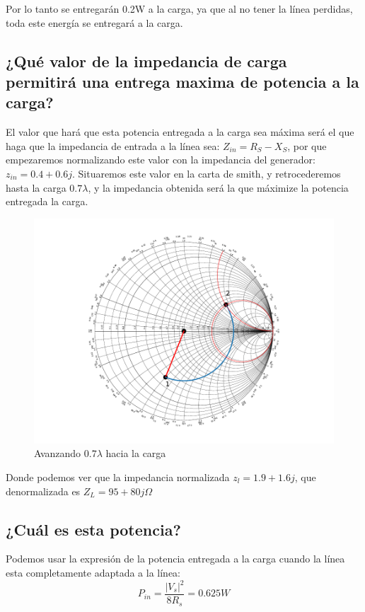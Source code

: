 Por lo tanto se entregarán 0.2W a la carga, ya que al no tener la línea perdidas, toda este energía se entregará a la carga.

\subsection{¿Qué valor de la impedancia de carga permitirá una entrega maxima de potencia a la carga?}
El valor que hará que esta potencia entregada a la carga sea máxima será el que haga que la impedancia de entrada a la línea sea: $Z_{in} = R_S - X_S$, por que empezaremos normalizando este valor con la impedancia del generador: $z_{in} = 0.4 + 0.6j$. Situaremos este valor en la carta de smith, y retrocederemos hasta la carga $0.7\lambda$, y la impedancia obtenida será la que máximize la potencia entregada  la carga.

\begin{figure}[h]
  \centering
  \includegraphics{ej6/images/out2.pdf}
  \caption{Avanzando $0.7\lambda$ hacia la carga}
  \label{ej2smith}
\end{figure}

Donde podemos ver que la impedancia normalizada $z_l = 1.9 +1.6j$, que denormalizada es $Z_L = 95 + 80j \Omega$

\subsection{¿Cuál es esta potencia?}
Podemos usar la expresión de la potencia entregada a la carga cuando la línea esta completamente adaptada a la línea:
\[P_{in} = \frac{|V_s|^2}{8R_s} = 0.625W\]
